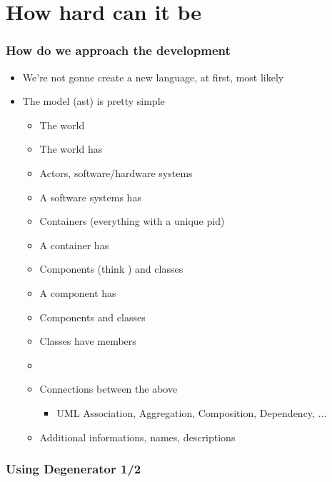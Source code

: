 \documentclass[xelatex,13pt]{beamer}
\begin{document}
\section{How hard can it be}
\begin{frame}
	\frametitle{How do we approach the development}
	\begin{itemize}
		\item We're not gonne create a new language\pause, at first\pause,
			most likely
			\pause
		\item The model (ast) is pretty simple
			\pause
		\begin{itemize}
			\item The world
			\item The world has
			\item Actors, software/hardware systems
			\item A software systems has
			\item Containers (everything with a unique pid)
			\item A container has
			\item Components (think \lstinline@module@) and classes
			\item A component has
			\item Components and classes
			\item Classes have members
			\item[]
			\item Connections between the above
			\begin{itemize}
				\item UML Association, Aggregation, Composition, Dependency, \(\dots\)
			\end{itemize}
			\item Additional informations, names, descriptions
		\end{itemize}
	\end{itemize}
\end{frame}

\begin{frame}
	\frametitle{Using Degenerator 1/2}
	
	\pause
	
	\pause
	
	\pause
	
\end{frame}
\end{document}

